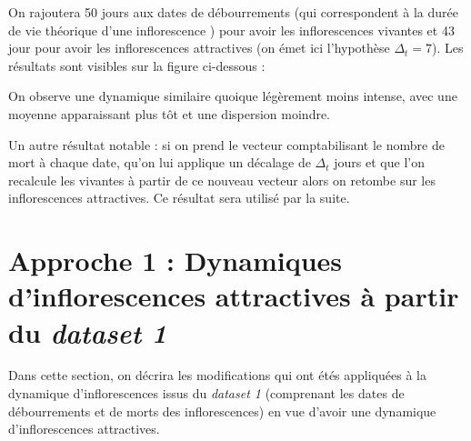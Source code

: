 \documentclass[a4paper, 11pt]{article}
\begin{document}
On rajoutera 50 jours aux dates de débourrements (qui correspondent à la durée de vie théorique d'une inflorescence \cite{laurie}) pour avoir les inflorescences vivantes et 43 jour pour avoir les inflorescences attractives (on émet ici l'hypothèse $\Delta_t = 7$). Les résultats sont visibles sur la figure ci-dessous : 

\begin{figure}[h]
 \centering
\end{figure}


On observe une dynamique similaire quoique légèrement moins intense, avec une moyenne apparaissant plus tôt et une dispersion moindre.

Un autre résultat notable : si on prend le vecteur comptabilisant le nombre de mort à chaque date, qu'on lui applique un décalage de $\Delta_t$ jours et que l'on recalcule les vivantes à partir de ce nouveau vecteur alors on retombe sur les inflorescences attractives.
Ce résultat sera utilisé par la suite.

\section{Approche 1 : Dynamiques d'inflorescences attractives à partir du \textit{dataset 1}}

Dans cette section, on décrira les modifications qui ont étés appliquées à la dynamique d'inflorescences issus du \textit{dataset 1} (comprenant les dates de débourrements et de morts des inflorescences) en vue d'avoir une dynamique d'inflorescences attractives.
\end{document}
